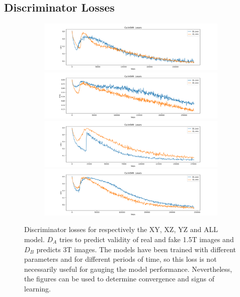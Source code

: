 \documentclass[11pt, fleqn, titlepage]{article}
\newcommand{\1}[1]{\mathds{1}\left[#1\right]}
\begin{document}
\subsection{Discriminator Losses}\label{disc_loss}
\begin{figure}[H]
	\centering
	\begin{subfigure}[b]{0.8\textwidth}
		\centering
		\includegraphics[width=\linewidth]{imgs/discriminator_losses/XY_model_discriminator_losses}
		\hfill
		\includegraphics[width=\linewidth]{imgs/discriminator_losses/XZ_model_discriminator_losses}
		\hfill
		\includegraphics[width=\linewidth]{imgs/discriminator_losses/YZ_model_discriminator_losses}
		\hfill
		\includegraphics[width=\linewidth]{imgs/discriminator_losses/ALL_model_discriminator_losses}
	\end{subfigure}
	\caption{Discriminator losses for respectively the XY, XZ, YZ and ALL model. $D_A$ tries to predict validity of real and fake 1.5T images and $D_B$ predicts 3T images. The models have been trained with different parameters and for different periods of time, so this loss is not necessarily useful for gauging the model performance. Nevertheless, the figures can be used to determine convergence and signs of learning.}
	\label{fig:discriminator_losses}
\end{figure}
\end{document}
